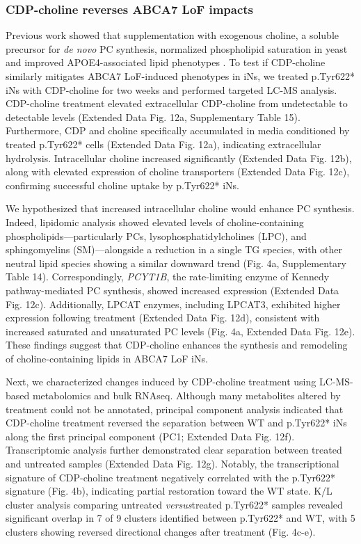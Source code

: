 \subsubsection{CDP-choline reverses ABCA7 LoF impacts}
Previous work showed that supplementation with exogenous choline, a soluble precursor for \textit{de novo} PC synthesis, normalized phospholipid saturation in yeast and improved APOE4-associated lipid phenotypes \supercite{Boumann2006-nz,Sienski2021-zt}. To test if CDP-choline similarly mitigates ABCA7 LoF-induced phenotypes in iNs, we treated p.Tyr622* iNs with CDP-choline for two weeks and performed targeted LC-MS analysis. CDP-choline treatment elevated extracellular CDP-choline from undetectable to detectable levels (Extended Data Fig. 12a, Supplementary Table 15). Furthermore, CDP and choline specifically accumulated in media conditioned by treated p.Tyr622* cells (Extended Data Fig. 12a), indicating extracellular hydrolysis. Intracellular choline increased significantly (Extended Data Fig. 12b), along with elevated expression of choline transporters (Extended Data Fig. 12c), confirming successful choline uptake by p.Tyr622* iNs.

We hypothesized that increased intracellular choline would enhance PC synthesis. Indeed, lipidomic analysis showed elevated levels of choline-containing phospholipids—particularly PCs, lysophosphatidylcholines (LPC), and sphingomyelins (SM)—alongside a reduction in a single TG species, with other neutral lipid species showing a similar downward trend (Fig. 4a, Supplementary Table 14). Correspondingly, \textit{PCYT1B}, the rate-limiting enzyme of Kennedy pathway-mediated PC synthesis, showed increased expression (Extended Data Fig. 12c). Additionally, LPCAT enzymes, including LPCAT3, exhibited higher expression following treatment (Extended Data Fig. 12d), consistent with increased saturated and unsaturated PC levels (Fig. 4a, Extended Data Fig. 12e). These findings suggest that CDP-choline enhances the synthesis and remodeling of choline-containing lipids in ABCA7 LoF iNs.

Next, we characterized changes induced by CDP-choline treatment using LC-MS-based metabolomics and bulk RNAseq. Although many metabolites altered by treatment could not be annotated, principal component analysis indicated that CDP-choline treatment reversed the separation between WT and p.Tyr622* iNs along the first principal component (PC1; Extended Data Fig. 12f). Transcriptomic analysis further demonstrated clear separation between treated and untreated samples (Extended Data Fig. 12g). Notably, the transcriptional signature of CDP-choline treatment negatively correlated with the p.Tyr622* signature (Fig. 4b), indicating partial restoration toward the WT state. K/L cluster analysis comparing untreated \textit{versus}treated p.Tyr622* samples revealed significant overlap in 7 of 9 clusters identified between p.Tyr622* and WT, with 5 clusters showing reversed directional changes after treatment (Fig. 4c-e).

